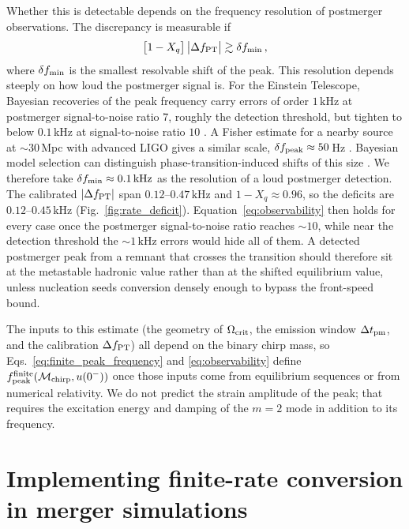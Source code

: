 \documentclass[10pt,superscriptaddress,amsmath,aps,prc,twocolumn,nofootinbib,floatfix]{revtex4-1}
\newcommand{\kHz}{\text{kHz}}
\begin{document}
Whether this is detectable depends on the frequency resolution of postmerger observations.
The discrepancy is measurable if
\begin{equation}
\bigl[1-X_q\bigr]\,\bigl|\Delta f_{\rm PT}\bigr|
\gtrsim\delta f_{\rm min}\,,
\label{eq:observability}
\end{equation}
where $\delta f_{\rm min}$ is the smallest resolvable shift of the peak.
This resolution depends steeply on how loud the postmerger signal is.
For the Einstein Telescope, Bayesian recoveries of the peak frequency carry errors of order $1\,\kHz$ at postmerger signal-to-noise ratio $7$, roughly the detection threshold, but tighten to below $0.1\,\kHz$ at signal-to-noise ratio $10$ \cite{Breschi:2022ens}.
A Fisher estimate for a nearby source at ${\sim}30\,$Mpc with advanced LIGO gives a similar scale, $\delta f_{\rm peak}\approx50\,$Hz \cite{Clark:2015zxa}.
Bayesian model selection can distinguish phase-transition-induced shifts of this size \cite{Prakash:2023afe}.
We therefore take $\delta f_{\rm min}\approx0.1\,\kHz$ as the resolution of a loud postmerger detection.
The calibrated $|\Delta f_{\rm PT}|$ span $0.12$--$0.47\,\kHz$ and $1-X_q\approx0.96$, so the deficits are $0.12$--$0.45\,\kHz$ (Fig.~\ref{fig:rate_deficit}).
Equation~\eqref{eq:observability} then holds for every case once the postmerger signal-to-noise ratio reaches ${\sim}10$, while near the detection threshold the ${\sim}1\,\kHz$ errors would hide all of them.
A detected postmerger peak from a remnant that crosses the transition should therefore sit at the metastable hadronic value rather than at the shifted equilibrium value, unless nucleation seeds conversion densely enough to bypass the front-speed bound.

The inputs to this estimate (the geometry of $\Omega_{\rm crit}$, the emission window $\Delta t_{\rm pm}$, and the calibration $\Delta f_{\rm PT}$) all depend on the binary chirp mass, so Eqs.~\eqref{eq:finite_peak_frequency} and \eqref{eq:observability} define $f_{\rm peak}^{\rm finite}(\mathcal{M}_{\rm chirp},u(0^-))$ once those inputs come from equilibrium sequences or from numerical relativity.
We do not predict the strain amplitude of the peak; that requires the excitation energy and damping of the $m=2$ mode in addition to its frequency.

\appendix

\section{Implementing finite-rate conversion in merger simulations}
\label{sec:finite_rate_implementation}
\end{document}
